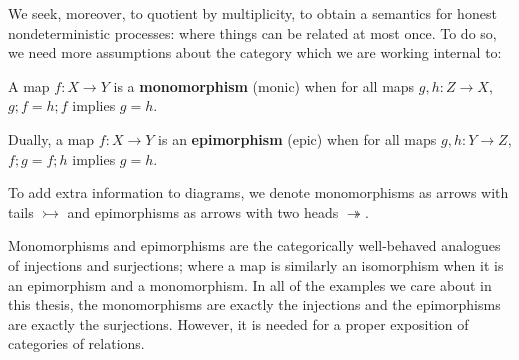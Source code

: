 We seek, moreover, to quotient by multiplicity, to obtain a semantics for honest nondeterministic processes: where things can be related at most once.  To do so, we need more assumptions about the category which we are working internal to:
\begin{definition}
\label{def:mono}
A map $f:X\to Y$ is a {\bf monomorphism} (monic) when for all maps $g,h:Z\to X$, $g;f=h;f$ implies $ g=h$.

Dually, a map $f:X\to Y$ is an {\bf epimorphism} (epic) when for all maps $g,h:Y\to Z$, $f;g=f;h$ implies $ g=h$.

To add extra information to diagrams, we denote monomorphisms as arrows with tails $\rightarrowtail$ and epimorphisms as arrows with two heads $\twoheadrightarrow$.  
\end{definition}
Monomorphisms and epimorphisms are the categorically well-behaved analogues of injections and surjections; where a map is similarly an isomorphism when it is an epimorphism and a monomorphism.  In all of the examples we care about in this thesis, the monomorphisms are exactly the injections and the epimorphisms are exactly the surjections.  However, it is needed for a proper exposition of categories of relations.

